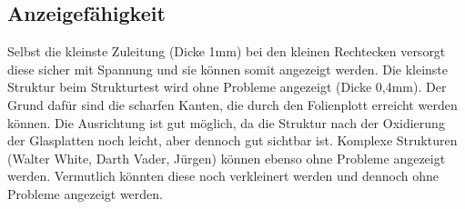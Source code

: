 \subsection{Anzeigefähigkeit}
Selbst die kleinste Zuleitung (Dicke 1mm) bei den kleinen Rechtecken versorgt diese sicher mit Spannung und sie können somit angezeigt werden. Die kleinste Struktur beim Strukturtest wird ohne Probleme angezeigt (Dicke 0,4mm). Der Grund dafür sind die scharfen Kanten, die durch den Folienplott erreicht werden können. Die Ausrichtung ist gut möglich, da die Struktur nach der Oxidierung der Glasplatten noch leicht, aber dennoch gut sichtbar ist. Komplexe Strukturen (Walter White, Darth Vader, Jürgen) können ebenso ohne Probleme angezeigt werden. Vermutlich könnten diese noch verkleinert werden und dennoch ohne Probleme angezeigt werden.

